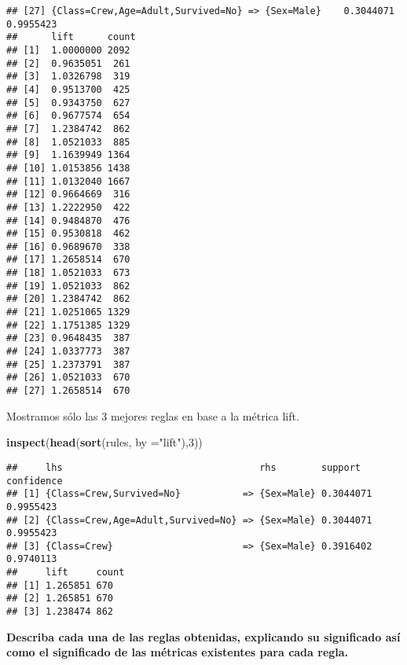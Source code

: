 \documentclass[]{article}
\newenvironment{Shaded}{\begin{snugshade}}{\end{snugshade}}
\newcommand{\DataTypeTok}[1]{\textcolor[rgb]{0.13,0.29,0.53}{#1}}
\newcommand{\DecValTok}[1]{\textcolor[rgb]{0.00,0.00,0.81}{#1}}
\newcommand{\KeywordTok}[1]{\textcolor[rgb]{0.13,0.29,0.53}{\textbf{#1}}}
\newcommand{\NormalTok}[1]{#1}
\newcommand{\StringTok}[1]{\textcolor[rgb]{0.31,0.60,0.02}{#1}}
\begin{document}
\begin{verbatim}
## [27] {Class=Crew,Age=Adult,Survived=No} => {Sex=Male}    0.3044071 0.9955423 
##      lift      count
## [1]  1.0000000 2092 
## [2]  0.9635051  261 
## [3]  1.0326798  319 
## [4]  0.9513700  425 
## [5]  0.9343750  627 
## [6]  0.9677574  654 
## [7]  1.2384742  862 
## [8]  1.0521033  885 
## [9]  1.1639949 1364 
## [10] 1.0153856 1438 
## [11] 1.0132040 1667 
## [12] 0.9664669  316 
## [13] 1.2222950  422 
## [14] 0.9484870  476 
## [15] 0.9530818  462 
## [16] 0.9689670  338 
## [17] 1.2658514  670 
## [18] 1.0521033  673 
## [19] 1.0521033  862 
## [20] 1.2384742  862 
## [21] 1.0251065 1329 
## [22] 1.1751385 1329 
## [23] 0.9648435  387 
## [24] 1.0337773  387 
## [25] 1.2373791  387 
## [26] 1.0521033  670 
## [27] 1.2658514  670
\end{verbatim}

Mostramos sólo las 3 mejores reglas en base a la métrica lift.

\begin{Shaded}
\begin{Highlighting}[]
\KeywordTok{inspect}\NormalTok{(}\KeywordTok{head}\NormalTok{(}\KeywordTok{sort}\NormalTok{(rules, }\DataTypeTok{by =}\StringTok{"lift"}\NormalTok{),}\DecValTok{3}\NormalTok{))}
\end{Highlighting}
\end{Shaded}

\begin{verbatim}
##     lhs                                   rhs        support   confidence
## [1] {Class=Crew,Survived=No}           => {Sex=Male} 0.3044071 0.9955423 
## [2] {Class=Crew,Age=Adult,Survived=No} => {Sex=Male} 0.3044071 0.9955423 
## [3] {Class=Crew}                       => {Sex=Male} 0.3916402 0.9740113 
##     lift     count
## [1] 1.265851 670  
## [2] 1.265851 670  
## [3] 1.238474 862
\end{verbatim}

\textbf{Describa cada una de las reglas obtenidas, explicando su
significado así como el significado de las métricas existentes para cada
regla.}
\end{document}
